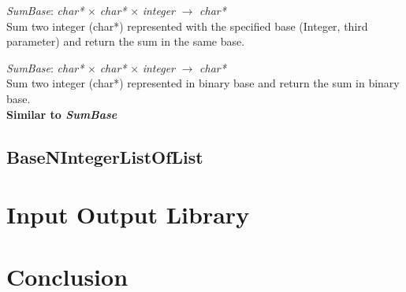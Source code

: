 \documentclass[book, backcover, english, nodocumentinfo]{upmethodology-document}
\begin{document}
		\begin{minipage}{\linewidth}
			\textit{SumBase}: \textit{char*} $\times$  \textit{char*} $\times$  \textit{integer} $\rightarrow$ \textit{char*}\\
			Sum two integer (char*) represented with the specified base (Integer, third parameter) and return the sum in the same base.
			\label{algo:BNIL-SumBase}
			
		\end{minipage}

		\begin{minipage}{\linewidth}
			\textit{SumBase}: \textit{char*} $\times$  \textit{char*} $\times$  \textit{integer} $\rightarrow$ \textit{char*}\\
			Sum two integer (char*) represented in binary base and return the sum in binary base.
			\label{algo:BNIL-SumBinary}\\
			\textbf{Similar to \textit{SumBase}}
		\end{minipage}
	\section{BaseNIntegerListOfList}
\chapter{Input Output Library}
\chapter{Conclusion}
\end{document}
